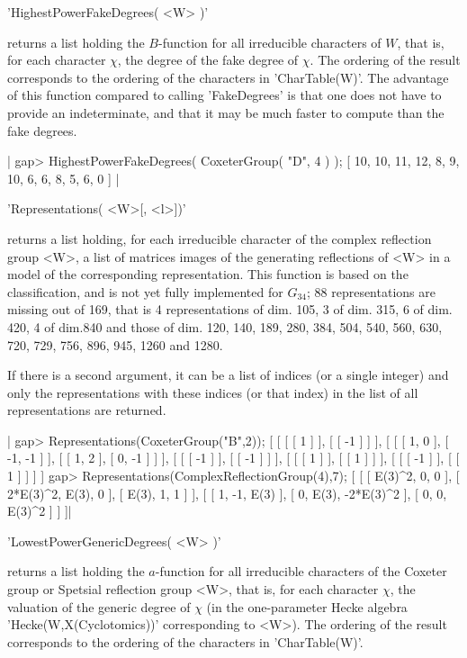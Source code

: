 'HighestPowerFakeDegrees( <W> )'

returns a list  holding the $B$-function for  all irreducible characters
of  $W$, that  is, for  each character  $\chi$, the  degree of  the fake
degree of $\chi$. The ordering of the result corresponds to the ordering
of  the characters  in 'CharTable(W)'.  The advantage  of this  function
compared to calling  'FakeDegrees' is that one does not  have to provide
an indeterminate,  and that it  may be much  faster to compute  than the
fake degrees.

|    gap> HighestPowerFakeDegrees( CoxeterGroup( "D", 4 ) );
    [ 10, 10, 11, 12, 8, 9, 10, 6, 6, 8, 5, 6, 0 ] |


'Representations( <W>[, <l>])'

returns  a  list  holding,  for  each  irreducible character of the complex
reflection  group  <W>,  a  list  of  matrices  images  of  the  generating
reflections  of <W>  in a  model of  the corresponding representation. This
function  is based on the classification,  and is not yet fully implemented
for  $G_{34}$;  88  representations  are  missing  out  of  169,  that is 4
representations of dim. 105, 3 of dim. 315, 6 of dim. 420, 4 of dim.840 and
those  of dim. 120, 140, 189, 280, 384,  504, 540, 560, 630, 720, 729, 756,
896, 945, 1260 and 1280.

If  there is a  second argument, it  can be a  list of indices (or a single
integer) and only the representations with these indices (or that index) in
the list of all representations are returned.

|    gap> Representations(CoxeterGroup("B",2));
    [ [ [ [ 1 ] ], [ [ -1 ] ] ],
      [ [ [ 1, 0 ], [ -1, -1 ] ], [ [ 1, 2 ], [ 0, -1 ] ] ],
      [ [ [ -1 ] ], [ [ -1 ] ] ], [ [ [ 1 ] ], [ [ 1 ] ] ],
      [ [ [ -1 ] ], [ [ 1 ] ] ] ]
    gap> Representations(ComplexReflectionGroup(4),7);
    [ [ [ E(3)^2, 0, 0 ], [ 2*E(3)^2, E(3), 0 ], [ E(3), 1, 1 ] ], 
      [ [ 1, -1, E(3) ], [ 0, E(3), -2*E(3)^2 ], [ 0, 0, E(3)^2 ] ] ]|


'LowestPowerGenericDegrees( <W> )'

returns  a list holding the $a$-function  for all irreducible characters of
the  Coxeter  group  or  Spetsial  reflection  group <W>, that is, for each
character  $\chi$, the  valuation of  the generic  degree of $\chi$ (in the
one-parameter  Hecke  algebra  'Hecke(W,X(Cyclotomics))'  corresponding  to
<W>).  The  ordering  of  the  result  corresponds  to  the ordering of the
characters in 'CharTable(W)'.

